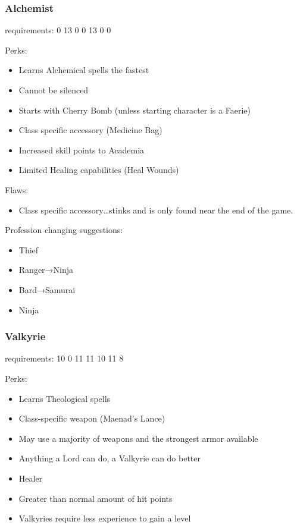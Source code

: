 \documentclass[12pt]{article}
\providecommand{\tightlist}{%
  \setlength{\itemsep}{0pt}\setlength{\parskip}{0pt}}
\begin{document}
\subsubsection{Alchemist}\label{alchemist}

requirements: 0 13 0 0 13 0 0

Perks:

\begin{itemize}
\item
  Learns Alchemical spells the fastest
\item
  Cannot be silenced
\item
  Starts with Cherry Bomb (unless starting character is a Faerie)
\item
  Class specific accessory (Medicine Bag)
\item
  Increased skill points to Academia
\item
  Limited Healing capabilities (Heal Wounds)
\end{itemize}

Flaws:

\begin{itemize}
\tightlist
\item
  Class specific accessory\ldots{}stinks and is only found near the end
  of the game.
\end{itemize}

Profession changing suggestions:

\begin{itemize}
\item
  Thief
\item
  Ranger→Ninja
\item
  Bard→Samurai
\item
  Ninja
\end{itemize}

\subsubsection{Valkyrie}\label{valkyrie}

requirements: 10 0 11 11 10 11 8

Perks:

\begin{itemize}
\item
  Learns Theological spells
\item
  Class-specific weapon (Maenad's Lance)
\item
  May use a majority of weapons and the strongest armor available
\item
  Anything a Lord can do, a Valkyrie can do better
\item
  Healer
\item
  Greater than normal amount of hit points
\item
  Valkyries require less experience to gain a level
\end{itemize}
\end{document}
